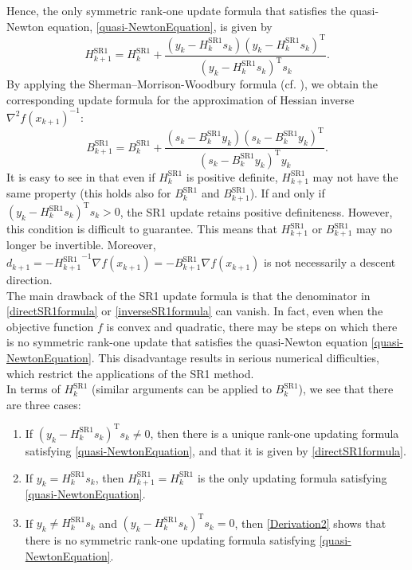 Hence, the only symmetric rank-one update formula that satisfies the quasi-Newton equation, \cref{quasi-NewtonEquation}, is given by
\begin{equation}\label{directSR1formula}
    H^\mathrm{SR1}_{k+1} = H^\mathrm{SR1}_k + \frac{(y_k - H^\mathrm{SR1}_k s_k) (y_k - H^\mathrm{SR1}_k s_k)^{\mathrm{T}}}{(y_k - H^\mathrm{SR1}_k s_k)^{\mathrm{T}} s_k}.
\end{equation}
By applying the Sherman–Morrison-Woodbury formula (cf. \cite[Theorem~1.2.16]{SunYuan:2006}), we obtain the corresponding update formula for the approximation of Hessian inverse ${\nabla^{2} f(x_{k+1})}^{-1}$:
\begin{equation}\label{inverseSR1formula}
    B^\mathrm{SR1}_{k+1} = B^\mathrm{SR1}_k + \frac{(s_k - B^\mathrm{SR1}_k y_k) (s_k - B^\mathrm{SR1}_k y_k)^{\mathrm{T}}}{(s_k - B^\mathrm{SR1}_k y_k)^{\mathrm{T}} y_k}.
\end{equation}
It is easy to see in that even if $H^\mathrm{SR1}_k$ is positive definite, $H^\mathrm{SR1}_{k+1}$ may not have the same property (this holds also for $B^\mathrm{SR1}_k$ and $B^\mathrm{SR1}_{k+1}$). If and only if $(y_k - H^\mathrm{SR1}_k s_k)^{\mathrm{T}} s_k > 0$, the SR1 update retains positive definiteness. However, this condition is difficult to guarantee. This means that $H^\mathrm{SR1}_{k+1}$ or $B^\mathrm{SR1}_{k+1}$ may no longer be invertible. Moreover, $d_{k+1} = -{H^\mathrm{SR1}_{k+1}}^{-1} \nabla f(x_{k+1}) = -B^\mathrm{SR1}_{k+1} \nabla f(x_{k+1})$ is not necessarily a descent direction. \\
The main drawback of the SR1 update formula is that the denominator in \cref{directSR1formula} or \cref{inverseSR1formula} can vanish. In fact, even when the objective function $f$ is convex and quadratic, there may be steps on which there is no symmetric rank-one update that satisfies the quasi-Newton equation \cref{quasi-NewtonEquation}. This disadvantage results in serious numerical difficulties, which restrict the applications of the SR1 method. \\ 
In terms of $H^\mathrm{SR1}_k$ (similar arguments can be applied to $B^\mathrm{SR1}_k$), we see that there are three cases:
\begin{enumerate}
    \item If $(y_k - H^\mathrm{SR1}_k s_k)^{\mathrm{T}} s_k \neq 0$, then there is a unique rank-one updating formula satisfying \cref{quasi-NewtonEquation}, and that it is given by \cref{directSR1formula}.
    \item If $y_k = H^\mathrm{SR1}_k s_k$, then $H^\mathrm{SR1}_{k+1} = H^\mathrm{SR1}_k$ is the only updating formula satisfying \cref{quasi-NewtonEquation}.
    \item If $y_k \neq H^\mathrm{SR1}_k s_k$ and $(y_k - H^\mathrm{SR1}_k s_k)^{\mathrm{T}} s_k = 0$, then \cref{Derivation2} shows that there is no symmetric rank-one updating formula satisfying \cref{quasi-NewtonEquation}.
\end{enumerate}

